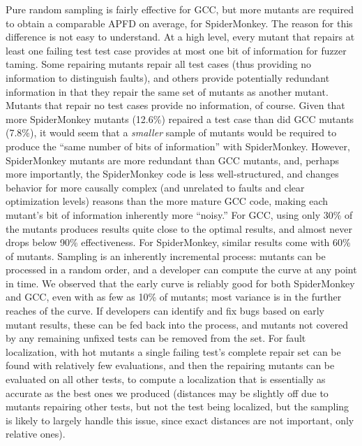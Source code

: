 Pure random sampling is fairly effective for GCC, but more mutants are required to obtain a comparable APFD on average, for SpiderMonkey.  The reason for this difference is not easy to understand.  At a high level, every mutant that repairs at least one failing test test case provides at most one bit of information for fuzzer taming.  Some repairing mutants repair all test cases (thus providing no information to distinguish faults), and others provide potentially redundant information in that they repair the same set of mutants as another mutant.  Mutants that repair no test cases provide no information, of course.  Given that more SpiderMonkey mutants (12.6\%) repaired a test case than did GCC mutants (7.8\%), it would seem that a \emph{smaller} sample of mutants would be required to produce the ``same number of bits of information'' with SpiderMonkey.  However, SpiderMonkey mutants are more redundant than GCC mutants, and, perhaps more importantly, the SpiderMonkey code is less well-structured, and changes behavior for more causally complex (and unrelated to faults and clear optimization levels) reasons than the more mature GCC code, making each mutant's bit of information inherently more ``noisy.''
For GCC, using only 30\% of the mutants produces results quite close to the optimal results, and almost never drops below 90\% effectiveness.  For SpiderMonkey, similar results come with 60\% of mutants.  Sampling is an inherently incremental process:  mutants can be processed in a random order, and a developer can compute the curve at any point in time.  We observed that the early curve is reliably good for both SpiderMonkey and GCC, even with as few as 10\% of mutants; most variance is in the further reaches of the curve.  If developers can identify and fix bugs based on early mutant results, these can be fed back into the process, and mutants not covered by any remaining unfixed tests can be removed from the set.  For fault localization, with hot mutants a single failing test's complete repair set can be found with relatively few evaluations, and then the repairing mutants can be evaluated on all other tests, to compute a localization that is essentially as accurate as the best ones we produced (distances may be slightly off due to mutants repairing other tests, but not the test being localized, but the sampling is likely to largely handle this issue, since exact distances are not important, only relative ones).

